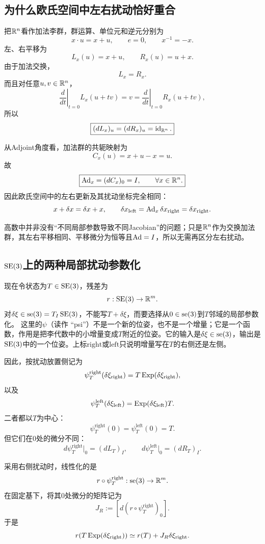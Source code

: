 \subsection{为什么欧氏空间中左右扰动恰好重合}

把$\mathbb{R}^n$看作加法李群，群运算、单位元和逆元分别为
\[
    x\cdot u=x+u,
    \qquad
    e=0,
    \qquad
    x^{-1}=-x.
\]
左、右平移为
\[
    L_x(u)=x+u,
    \qquad
    R_x(u)=u+x.
\]
由于加法交换，
\[
    \boxed{L_x=R_x.}
\]
而且对任意$u,v\in\mathbb{R}^n$，
\[
    \left.\frac{d}{dt}\right|_{t=0}L_x(u+tv)
    =v
    =\left.\frac{d}{dt}\right|_{t=0}R_x(u+tv),
\]
所以
\[
    \boxed{
    (dL_x)_u=(dR_x)_u=\operatorname{id}_{\mathbb{R}^n}.
    }
\]

从Adjoint角度看，加法群的共轭映射为
\[
    C_x(u)=x+u-x=u.
\]
故
\[
    \boxed{
    \operatorname{Ad}_x=(dC_x)_0=I,
    \qquad \forall x\in\mathbb{R}^n.
    }
\]
因此欧氏空间中的左右更新及其扰动坐标完全相同：
\[
    x+\delta x=\delta x+x,
    \qquad
    \delta x_{\mathrm{left}}
    =\operatorname{Ad}_x\delta x_{\mathrm{right}}
    =\delta x_{\mathrm{right}}.
\]

高数中并非没有“不同局部参数导致不同Jacobian”的问题；只是$\mathbb{R}^n$作为交换加法群，其左右平移相同、平移微分为恒等且$\operatorname{Ad}=I$，所以无需再区分左右扰动。

\subsection{$\operatorname{SE}(3)$上的两种局部扰动参数化}

现在令状态为$T\in\operatorname{SE}(3)$，残差为
\[
    r:\operatorname{SE}(3)\to\mathbb{R}^m.
\]
对$\delta\xi\in\operatorname{se}(3)=T_I\operatorname{SE}(3)$，不能写$T+\delta\xi$，而要选择从$0\in\operatorname{se}(3)$到$T$邻域的局部参数化。
这里的$\psi$（读作 ``psi''）不是一个新的位姿，也不是一个增量；它是一个函数，作用是把李代数中的小增量变成$T$附近的位姿。它的输入是$\delta\xi\in\operatorname{se}(3)$，输出是$\operatorname{SE}(3)$中的一个位姿。上标$\mathrm{right}$或$\mathrm{left}$只说明增量写在$T$的右侧还是左侧。

因此，按扰动放置侧记为
\[
    \psi_T^{\mathrm{right}}(\delta\xi_{\mathrm{right}})
    =T\operatorname{Exp}(\delta\xi_{\mathrm{right}}),
\]
以及
\[
    \psi_T^{\mathrm{left}}(\delta\xi_{\mathrm{left}})
    =\operatorname{Exp}(\delta\xi_{\mathrm{left}})T.
\]
二者都以$T$为中心：
\[
    \psi_T^{\mathrm{right}}(0)
    =\psi_T^{\mathrm{left}}(0)
    =T.
\]
但它们在$0$处的微分不同：
\[
    d\psi_T^{\mathrm{right}}\big|_0=(dL_T)_I,
    \qquad
    d\psi_T^{\mathrm{left}}\big|_0=(dR_T)_I.
\]

采用右侧扰动时，线性化的是
\[
    r\circ\psi_T^{\mathrm{right}}:\operatorname{se}(3)\to\mathbb{R}^m.
\]
在固定基下，将其$0$处微分的矩阵记为
\[
    \boxed{
    J_R:=\left[d(r\circ\psi_T^{\mathrm{right}})_0\right].
    }
\]
于是
\[
    r(T\operatorname{Exp}(\delta\xi_{\mathrm{right}}))
    \simeq
    r(T)+J_R\delta\xi_{\mathrm{right}}.
\]


